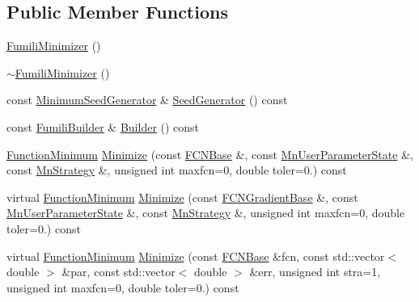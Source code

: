\subsection*{Public Member Functions}
\begin{DoxyCompactItemize}
\item 
\mbox{\hyperlink{classROOT_1_1Minuit2_1_1FumiliMinimizer_af33036073afd0161dbe9fd2fe0866575}{Fumili\+Minimizer}} ()
\item 
\mbox{\hyperlink{classROOT_1_1Minuit2_1_1FumiliMinimizer_a2e482171de26d153b98228aa41adee3e}{$\sim$\+Fumili\+Minimizer}} ()
\item 
const \mbox{\hyperlink{classROOT_1_1Minuit2_1_1MinimumSeedGenerator}{Minimum\+Seed\+Generator}} \& \mbox{\hyperlink{classROOT_1_1Minuit2_1_1FumiliMinimizer_ad8906dbac7f0c20284e361be606d5634}{Seed\+Generator}} () const
\item 
const \mbox{\hyperlink{classROOT_1_1Minuit2_1_1FumiliBuilder}{Fumili\+Builder}} \& \mbox{\hyperlink{classROOT_1_1Minuit2_1_1FumiliMinimizer_a24d20e7cd4a335f60616fd7cafe0739c}{Builder}} () const
\item 
\mbox{\hyperlink{classROOT_1_1Minuit2_1_1FunctionMinimum}{Function\+Minimum}} \mbox{\hyperlink{classROOT_1_1Minuit2_1_1FumiliMinimizer_a3da0ec7b2ba7f876809f72d2f3054eec}{Minimize}} (const \mbox{\hyperlink{classROOT_1_1Minuit2_1_1FCNBase}{F\+C\+N\+Base}} \&, const \mbox{\hyperlink{classROOT_1_1Minuit2_1_1MnUserParameterState}{Mn\+User\+Parameter\+State}} \&, const \mbox{\hyperlink{classROOT_1_1Minuit2_1_1MnStrategy}{Mn\+Strategy}} \&, unsigned int maxfcn=0, double toler=0.) const
\item 
virtual \mbox{\hyperlink{classROOT_1_1Minuit2_1_1FunctionMinimum}{Function\+Minimum}} \mbox{\hyperlink{classROOT_1_1Minuit2_1_1FumiliMinimizer_afe0f09e5e093e65ac8fadc13c459ad5c}{Minimize}} (const \mbox{\hyperlink{classROOT_1_1Minuit2_1_1FCNGradientBase}{F\+C\+N\+Gradient\+Base}} \&, const \mbox{\hyperlink{classROOT_1_1Minuit2_1_1MnUserParameterState}{Mn\+User\+Parameter\+State}} \&, const \mbox{\hyperlink{classROOT_1_1Minuit2_1_1MnStrategy}{Mn\+Strategy}} \&, unsigned int maxfcn=0, double toler=0.) const
\item 
virtual \mbox{\hyperlink{classROOT_1_1Minuit2_1_1FunctionMinimum}{Function\+Minimum}} \mbox{\hyperlink{classROOT_1_1Minuit2_1_1FumiliMinimizer_ab9ec6dd4a0e664db7d23a3ea3b0a3c75}{Minimize}} (const \mbox{\hyperlink{classROOT_1_1Minuit2_1_1FCNBase}{F\+C\+N\+Base}} \&fcn, const std\+::vector$<$ double $>$ \&par, const std\+::vector$<$ double $>$ \&err, unsigned int stra=1, unsigned int maxfcn=0, double toler=0.) const

\end{DoxyCompactItemize}
